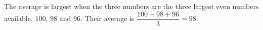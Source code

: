 The average is largest when the three numbers are the three largest even numbers available, $100$, $98$ and $96$. Their average is $\dfrac{100+98+96}{3}=\boxed{98}$.
